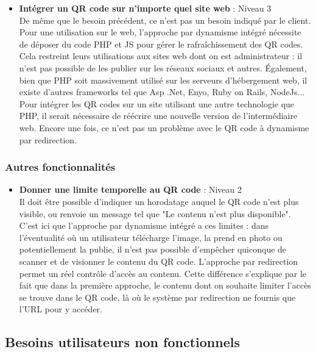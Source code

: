 \documentclass[a4paper,12pt]{article}
\begin{document}
\begin{itemize}
  \item \textbf{Intégrer un QR code sur n'importe quel site web} : Niveau 3\\
  De même que le besoin précédent, ce n'est pas un besoin indiqué par le client. Pour une utilisation sur le web, l'approche par dynamisme intégré nécessite de déposer du code PHP et JS pour gérer le rafraîchissement des QR codes.\\ Cela restreint leurs utilisations aux sites web dont on est administrateur : il n’est pas possible de les publier sur les réseaux sociaux et autres. Également, bien que PHP soit massivement utilisé sur les serveurs d’hébergement web, il existe d’autres frameworks tel que Asp .Net, Enyo, Ruby on Rails, NodeJs... Pour intégrer les QR codes sur un site utilisant une autre technologie que PHP, il serait nécessaire de réécrire une nouvelle version de l’intermédiaire web.
  Encore une fois, ce n'est pas un problème avec le QR code à dynamisme par redirection.\\
  
\end{itemize}
\subsubsection{Autres fonctionnalités}

\begin{itemize}
  
  \item \textbf{Donner une limite temporelle au QR code} : Niveau 2\\
  Il doit être possible d'indiquer un horodatage auquel le QR code n'est plus visible, ou renvoie un message tel que "Le contenu n'est plus disponible". C'est ici que l'approche par dynamisme intégré a ces limites : dans l’éventualité où un utilisateur télécharge l’image, la prend en photo ou potentiellement la publie, il n’est pas possible d’empêcher quiconque de scanner et de visionner le contenu du QR code. L'approche par redirection permet un réel contrôle d'accès au contenu. Cette différence s'explique par le fait que dans la première approche, le contenu dont on souhaite limiter l'accès se trouve dans le QR code, là où le système par redirection ne fournis que l'URL pour y accéder.\\
  
\end{itemize}

\subsection{Besoins utilisateurs non fonctionnels}
\end{document}

